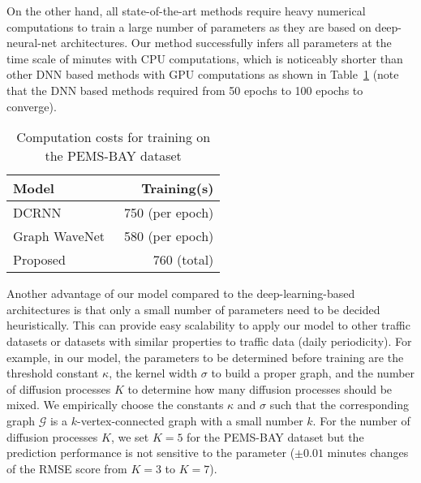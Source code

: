 \documentclass[journal]{IEEEtran}
\begin{document}
On the other hand, all state-of-the-art methods require heavy numerical computations to train a large number of parameters as they are based on deep-neural-net architectures.
Our method successfully infers all parameters at the time scale of minutes with CPU computations, which is noticeably shorter than other DNN based methods with GPU computations as shown in Table~\ref{table:computation} (note that the DNN based methods required from 50 epochs to 100 epochs to converge).

\begin{table}[t!]
\caption{Computation costs for training on the PEMS-BAY dataset}
\label{table:computation}
\centering
\begin{tabular}{lr}
\toprule
Model &    Training(s)\\
\midrule
DCRNN~\cite{li2018diffusion}        &  750 (per epoch)\\
Graph WaveNet~\cite{xu2018graph} &  580 (per epoch)\\
Proposed       &  760 (total)\\
\bottomrule
\end{tabular}
\end{table}



Another advantage of our model compared to the deep-learning-based architectures is that only a small number of parameters need to be decided heuristically. This can provide easy scalability to apply our model to other traffic datasets or datasets with similar properties to traffic data (daily periodicity).
For example, in our model, the parameters to be determined before training are the threshold constant $\kappa$, the kernel width $\sigma$ to build a proper graph, and the number of diffusion processes $K$ to determine how many diffusion processes should be mixed. 
We empirically choose the constants $\kappa$ and $\sigma$ such that the corresponding graph $\mathcal{G}$ is a $k$-vertex-connected graph with a small number $k$.
For the number of diffusion processes $K$, we set $K=5$ for the PEMS-BAY dataset but the prediction performance is not sensitive to the parameter ($\pm0.01$ minutes changes of the RMSE score from $K=3$ to $K=7$).
\end{document}
